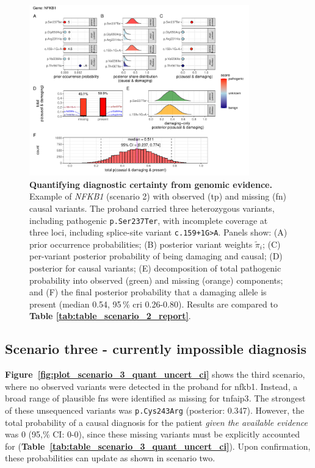 \begin{figure}[h]
  \centering
  \includegraphics[width=0.85\textwidth]{../images/plot_scenario_2_quant_uncert_ci.pdf}
  \caption{\textbf{Quantifying diagnostic certainty from genomic evidence.}
Example of \textit{NFKB1} (scenario 2) with observed (\ac{tp}) and missing (\ac{fn}) causal variants. The proband carried three heterozygous variants, including pathogenic \texttt{p.Ser237Ter}, with incomplete coverage at three loci, including splice-site variant \texttt{c.159+1G{\small\textgreater}A}. Panels show: (A) prior occurrence probabilities; (B) posterior variant weights \(\tilde{\pi}_i\); (C) per-variant posterior probability of being damaging and causal; (D) posterior for causal variants; (E) decomposition of total pathogenic probability into observed (green) and missing (orange) components; and (F) the final posterior probability that a damaging allele is present (median 0.54, 95\,\% \ac{cri} 0.26-0.80). Results are compared to \textbf{Table \ref{tab:table_scenario_2_report}}.
}
  \label{fig:plot_scenario_2_quant_uncert_ci}
\end{figure}

\subsection{Scenario three - currently impossible diagnosis}

\textbf{Figure~\ref{fig:plot_scenario_3_quant_uncert_ci}} shows the third scenario, where no observed variants were detected in the proband for \ac{nfkb1}. Instead, a broad range of plausible \ac{fn}s were identified as missing for \ac{tnfaip3}. The strongest of these unsequenced variants was \texttt{p.Cys243Arg} (posterior: 0.347). However, the total probability of a causal diagnosis for the patient \emph{given the available evidence} was 0 (95,\% CI: 0-0), since these missing variants must be explicitly accounted for (\textbf{Table~\ref{tab:table_scenario_3_quant_uncert_ci}}). Upon confirmation, these probabilities can update as shown in scenario two.

